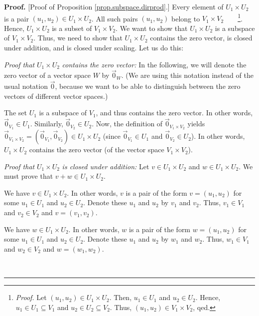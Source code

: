 \documentclass[numbers=enddot,12pt,final,onecolumn,notitlepage]{scrartcl}%
\theoremstyle{definition}
\newenvironment{proof}[1][Proof]{\noindent\textbf{#1.} }{\ \rule{0.5em}{0.5em}}
\begin{document}
\begin{proof}
[Proof of Proposition \ref{prop.subspace.dirprod}.] Every element of
$U_{1}\times U_{2}$ is a pair $\left(  u_{1},u_{2}\right)  \in U_{1}\times
U_{2}$. All such pairs $\left(  u_{1},u_{2}\right)  $ belong to $V_{1}\times
V_{2}$\ \ \ \ \footnote{\textit{Proof.} Let $\left(  u_{1},u_{2}\right)  \in
U_{1}\times U_{2}$. Then, $u_{1}\in U_{1}$ and $u_{2}\in U_{2}$. Hence,
$u_{1}\in U_{1}\subseteq V_{1}$ and $u_{2}\in U_{2}\subseteq V_{2}$. Thus,
$\left(  u_{1},u_{2}\right)  \in V_{1}\times V_{2}$, qed.}. Hence,
$U_{1}\times U_{2}$ is a subset of $V_{1}\times V_{2}$. We want to show that
$U_{1}\times U_{2}$ is a subspace of $V_{1}\times V_{2}$. Thus, we need to
show that $U_{1}\times U_{2}$ contains the zero vector, is closed under
addition, and is closed under scaling. Let us do this:

\textit{Proof that }$U_{1}\times U_{2}$\textit{ contains the zero vector:} In
the following, we will denote the zero vector of a vector space $W$ by
$\overrightarrow{0}_{W}$. (We are using this notation instead of the usual
notation $\overrightarrow{0}$, because we want to be able to distinguish
between the zero vectors of different vector spaces.)

The set $U_{1}$ is a subspace of $V_{1}$, and thus contains the zero vector.
In other words, $\overrightarrow{0}_{V_{1}}\in U_{1}$. Similarly,
$\overrightarrow{0}_{V_{2}}\in U_{2}$. Now, the definition of
$\overrightarrow{0}_{V_{1}\times V_{2}}$ yields $\overrightarrow{0}%
_{V_{1}\times V_{2}}=\left(  \overrightarrow{0}_{V_{1}},\overrightarrow{0}%
_{V_{2}}\right)  \in U_{1}\times U_{2}$ (since $\overrightarrow{0}_{V_{1}}\in
U_{1}$ and $\overrightarrow{0}_{V_{2}}\in U_{2}$). In other words,
$U_{1}\times U_{2}$ contains the zero vector (of the vector space $V_{1}\times
V_{2}$).

\textit{Proof that }$U_{1}\times U_{2}$ \textit{is closed under addition:} Let
$v\in U_{1}\times U_{2}$ and $w\in U_{1}\times U_{2}$. We must prove that
$v+w\in U_{1}\times U_{2}$.

We have $v\in U_{1}\times U_{2}$. In other words, $v$ is a pair of the form
$v=\left(  u_{1},u_{2}\right)  $ for some $u_{1}\in U_{1}$ and $u_{2}\in
U_{2}$. Denote these $u_{1}$ and $u_{2}$ by $v_{1}$ and $v_{2}$. Thus,
$v_{1}\in V_{1}$ and $v_{2}\in V_{2}$ and $v=\left(  v_{1},v_{2}\right)  $.

We have $w\in U_{1}\times U_{2}$. In other words, $w$ is a pair of the form
$w=\left(  u_{1},u_{2}\right)  $ for some $u_{1}\in U_{1}$ and $u_{2}\in
U_{2}$. Denote these $u_{1}$ and $u_{2}$ by $w_{1}$ and $w_{2}$. Thus,
$w_{1}\in V_{1}$ and $w_{2}\in V_{2}$ and $w=\left(  w_{1},w_{2}\right)  $.


\end{proof}
\end{document}
